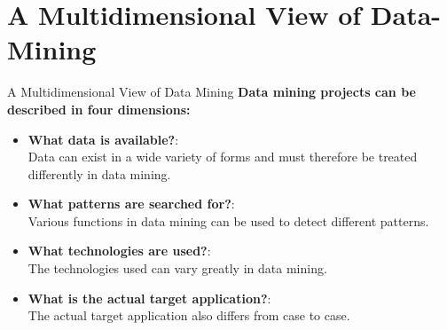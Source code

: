 \section{A Multidimensional View of Data-Mining}

\begin{frame}{A Multidimensional View of Data Mining}
	\textbf{Data mining projects can be described in four dimensions:}
	\begin{itemize}
		\item \textbf{What data is available?}:\\
			\small{
				Data can exist in a wide variety of forms and must therefore be 
				treated differently in data mining.
			}
		\item \textbf{What patterns are searched for?}:\\
			\small{
				Various functions in data mining can be used to detect 
				different patterns.
			}
		\item \textbf{What technologies are used?}:\\
			\small{
				The technologies used can vary greatly in data mining.
			}
		\item \textbf{What is the actual target application?}:\\
			\small{
				The actual target application also differs from case to case.
			}
	\end{itemize}
\end{frame}